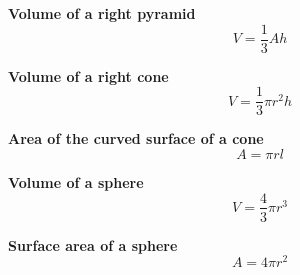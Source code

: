 \documentclass{report}
\begin{document}
\begin{minipage}{0.5\textwidth}
    \textbf{Volume of a right pyramid}\\
    \[
    V = \frac{1}{3} A h
    \]

    \vspace{1cm}

    \textbf{Volume of a right cone}\\
    \[
    V = \frac{1}{3} \pi r^2 h
    \]

    \vspace{1cm}

    \textbf{Area of the curved surface of a cone}\\
    \[
    A = \pi r l
    \]

    \vspace{1cm}

    \textbf{Volume of a sphere}\\
    \[
    V = \frac{4}{3} \pi r^3
    \]

    \vspace{0.5cm}

    \textbf{Surface area of a sphere}\\
    \[
    A = 4 \pi r^2
    \]
\end{minipage}
\hfill
\end{document}
